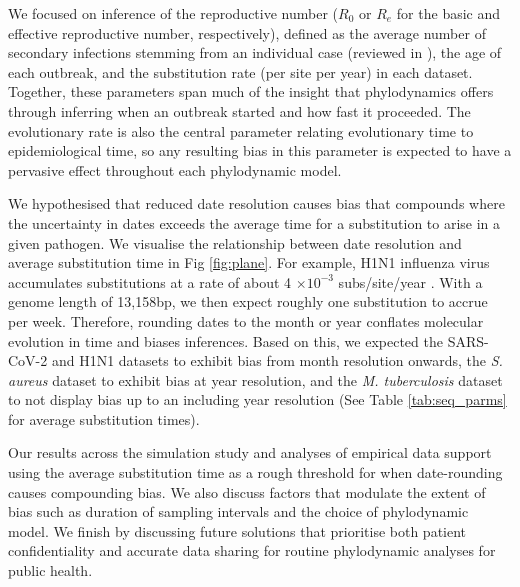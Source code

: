 \documentclass[12pt]{article}
\begin{document}
\begin{spacing}{2}
We focused on inference of the reproductive number ($R_0$ or $R_e$ for the basic and effective reproductive number, respectively), defined as the average number of secondary infections stemming from an individual case (reviewed in \citep{featherstone2022epidemiological, du2015getting, kuhnert2011phylogenetic}), the age of each outbreak, and the substitution rate (per site per year) in each dataset. Together, these parameters span much of the insight that phylodynamics offers through inferring when an outbreak started and how fast it proceeded. The evolutionary rate is also the central parameter relating evolutionary time to epidemiological time, so any resulting bias in this parameter is expected to have a pervasive effect throughout each phylodynamic model.

 We hypothesised that reduced date resolution causes bias that compounds where the uncertainty in dates exceeds the average time for a substitution to arise in a given pathogen. We visualise the relationship between date resolution and average substitution time in Fig \ref{fig:plane}. For example, H1N1 influenza virus accumulates substitutions at a rate of about 4 $\times10^{-3}$ subs/site/year \citep{hedge_2013_real-time}. With a genome length of 13,158bp, we then expect roughly one substitution to accrue per week. Therefore, rounding dates to the month or year conflates molecular evolution in time and biases inferences. Based on this, we expected the SARS-CoV-2 and H1N1 datasets to exhibit bias from month resolution onwards, the \textit{S. aureus} dataset to exhibit bias at year resolution, and the \textit{M. tuberculosis} dataset to not display bias up to an including year resolution (See Table \ref{tab:seq_parms} for average substitution times).
 
 Our results across the simulation study and analyses of empirical data support using the average substitution time as a rough threshold for when date-rounding causes compounding bias. We also discuss factors that modulate the extent of bias such as duration of sampling intervals and the choice of phylodynamic model. We finish by discussing future solutions that prioritise both patient confidentiality and accurate data sharing for routine phylodynamic analyses for public health.


\end{spacing}
\end{document}
